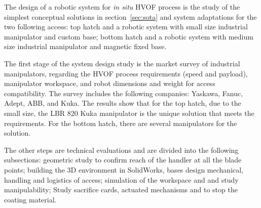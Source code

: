 The design of a robotic system for \textit{in situ} HVOF process is the study
of the simplest conceptual solutions in section~\ref{sec:sota} and
system adaptations for the two following access:
top hatch and a robotic system with small size industrial manipulator and custom
base; bottom hatch and a robotic system with medium size industrial manipulator
and magnetic fixed base.


The first stage of the system design study is the market survey of
industrial manipulators, regarding the HVOF process requirements
(speed and payload), manipulator workspace, and robot dimensions and weight for
access compatibility. The survey includes the following companies: Yaskawa,
Fanuc, Adept, ABB, and Kuka. The results show that for the top hatch, due to the small
size, the LBR 820 Kuka manipulator is the unique solution that meets the
requirements. For the bottom hatch, there are several manipulators for
the solution.



The other steps are technical evaluations and are divided into the following
subsections: geometric study to confirm reach of the handler at all
the blade points; building the 3D environment in SolidWorks, bases design
mechanical, handling and logistics of access; simulation of the workspace and
and study manipulability; Study sacrifice cards, actuated mechanisms
and to stop the coating material.

